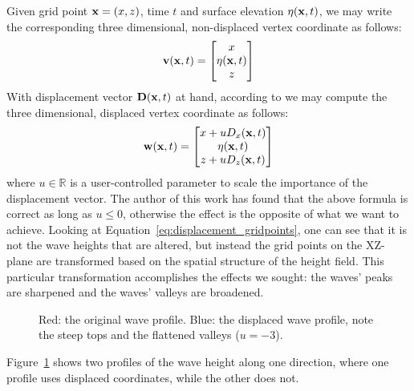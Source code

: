 Given grid point $\mathbf{x} = (x,z)$, time $t$ and surface elevation $\eta(\mathbf{x},t)$, 
we may write the corresponding three dimensional, non-displaced vertex 
coordinate as follows:
\begin{equation}
 \mathbf{v}(\mathbf{x},t) = \begin{bmatrix}x\\ \eta(\mathbf{x},t)\\ z\end{bmatrix} 
\end{equation}
With displacement vector $\mathbf{D}(\mathbf{x},t)$ at hand, according to 
\citet{course:simulatingocean} we may compute the three dimensional,
displaced vertex coordinate as follows:
\begin{equation}
\label{eq:displacement_gridpoints}
 \mathbf{w}(\mathbf{x},t) =
 \begin{bmatrix}
  x + u D_x(\mathbf{x},t)\\ 
  \eta(\mathbf{x},t)\\
  z + u D_z(\mathbf{x},t)
 \end{bmatrix}
\end{equation}
where $u\in\mathbb{R}$ is a user-controlled parameter to scale the importance of the
displacement vector. The author of this work has found that the above formula
is correct as long as $u \leq 0$, otherwise the effect is the opposite of 
what we want to achieve. Looking at Equation~\ref{eq:displacement_gridpoints},
one can see that it is not the wave heights that are altered, but instead the grid
points on the XZ-plane are transformed based on the spatial structure of the
height field. This particular transformation accomplishes the effects we sought:
the waves' peaks are sharpened and the waves' valleys are broadened.
%
\begin{figure}
\centering
{}
\caption{Red: the original wave profile. Blue: the displaced wave profile, note 
the steep tops and the flattened valleys ($u = -3$).}
\label{fig:grid_displaced}
\end{figure}
%
Figure~\ref{fig:grid_displaced} shows two profiles of the wave height along one 
direction, where one profile uses displaced coordinates, while the other does 
not.
%
